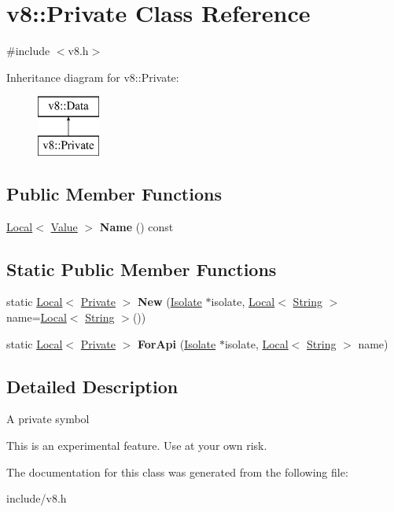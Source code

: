 \hypertarget{classv8_1_1_private}{}\section{v8\+:\+:Private Class Reference}
\label{classv8_1_1_private}


{\ttfamily \#include $<$v8.\+h$>$}

Inheritance diagram for v8\+:\+:Private\+:\begin{figure}[H]
\begin{center}
\leavevmode
\includegraphics[height=2.000000cm]{classv8_1_1_private}
\end{center}
\end{figure}
\subsection*{Public Member Functions}
\begin{DoxyCompactItemize}
\item 
\hyperlink{classv8_1_1_local}{Local}$<$ \hyperlink{classv8_1_1_value}{Value} $>$ {\bfseries Name} () const \hypertarget{classv8_1_1_private_a346820b1e830262d7f4f31e5c5ac7304}{}\label{classv8_1_1_private_a346820b1e830262d7f4f31e5c5ac7304}

\end{DoxyCompactItemize}
\subsection*{Static Public Member Functions}
\begin{DoxyCompactItemize}
\item 
static \hyperlink{classv8_1_1_local}{Local}$<$ \hyperlink{classv8_1_1_private}{Private} $>$ {\bfseries New} (\hyperlink{classv8_1_1_isolate}{Isolate} $\ast$isolate, \hyperlink{classv8_1_1_local}{Local}$<$ \hyperlink{classv8_1_1_string}{String} $>$ name=\hyperlink{classv8_1_1_local}{Local}$<$ \hyperlink{classv8_1_1_string}{String} $>$())\hypertarget{classv8_1_1_private_ae43aa9516121ed7a24cf5bba1654b653}{}\label{classv8_1_1_private_ae43aa9516121ed7a24cf5bba1654b653}

\item 
static \hyperlink{classv8_1_1_local}{Local}$<$ \hyperlink{classv8_1_1_private}{Private} $>$ {\bfseries For\+Api} (\hyperlink{classv8_1_1_isolate}{Isolate} $\ast$isolate, \hyperlink{classv8_1_1_local}{Local}$<$ \hyperlink{classv8_1_1_string}{String} $>$ name)\hypertarget{classv8_1_1_private_a0ab8628387166b8a8abc6e9b6f40ad55}{}\label{classv8_1_1_private_a0ab8628387166b8a8abc6e9b6f40ad55}

\end{DoxyCompactItemize}


\subsection{Detailed Description}
A private symbol

This is an experimental feature. Use at your own risk. 

The documentation for this class was generated from the following file\+:\begin{DoxyCompactItemize}
\item 
include/v8.\+h\end{DoxyCompactItemize}
